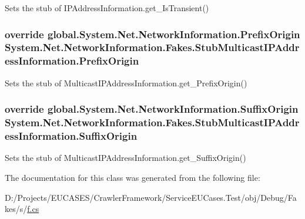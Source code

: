 Sets the stub of I\-P\-Address\-Information.\-get\-\_\-\-Is\-Transient()

\hypertarget{class_system_1_1_net_1_1_network_information_1_1_fakes_1_1_stub_multicast_i_p_address_information_a3bd050dc4ed8a8117a240bc54f2078c2}{
\subsubsection[{Prefix\-Origin}]{\setlength{\rightskip}{0pt plus 5cm}override global.\-System.\-Net.\-Network\-Information.\-Prefix\-Origin System.\-Net.\-Network\-Information.\-Fakes.\-Stub\-Multicast\-I\-P\-Address\-Information.\-Prefix\-Origin\hspace{0.3cm}{\ttfamily [get]}}}\label{class_system_1_1_net_1_1_network_information_1_1_fakes_1_1_stub_multicast_i_p_address_information_a3bd050dc4ed8a8117a240bc54f2078c2}


Sets the stub of Multicast\-I\-P\-Address\-Information.\-get\-\_\-\-Prefix\-Origin()

\hypertarget{class_system_1_1_net_1_1_network_information_1_1_fakes_1_1_stub_multicast_i_p_address_information_a6a1aab8a43e1d64462f87645f8688cb9}{
\subsubsection[{Suffix\-Origin}]{\setlength{\rightskip}{0pt plus 5cm}override global.\-System.\-Net.\-Network\-Information.\-Suffix\-Origin System.\-Net.\-Network\-Information.\-Fakes.\-Stub\-Multicast\-I\-P\-Address\-Information.\-Suffix\-Origin\hspace{0.3cm}{\ttfamily [get]}}}\label{class_system_1_1_net_1_1_network_information_1_1_fakes_1_1_stub_multicast_i_p_address_information_a6a1aab8a43e1d64462f87645f8688cb9}


Sets the stub of Multicast\-I\-P\-Address\-Information.\-get\-\_\-\-Suffix\-Origin()



The documentation for this class was generated from the following file\-:\begin{DoxyCompactItemize}
\item 
D\-:/\-Projects/\-E\-U\-C\-A\-S\-E\-S/\-Crawler\-Framework/\-Service\-E\-U\-Cases.\-Test/obj/\-Debug/\-Fakes/s/\hyperlink{s_2f_8cs}{f.\-cs}\end{DoxyCompactItemize}

